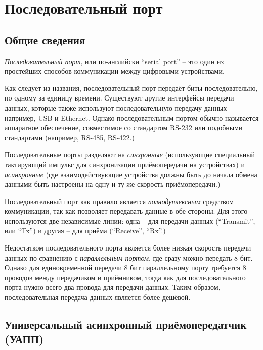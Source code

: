 \documentclass[../sparc.tex]{subfiles}
\begin{document}
\section{Последовательный порт}
\label{section:communication-serial-port}

\subsection{Общие сведения}

\emph{Последовательный порт}, или по-английски ``serial port'' -- это один из
простейших способов коммуникации между цифровыми устройствами.

Как следует из названия, последовательный порт передаёт биты последовательно, по
одному за единицу времени.  Существуют другие интерфейсы передачи данных,
которые также используют последовательную передачу данных -- например, USB и
Ethernet.  Однако последовательным портом обычно называется аппаратное
обеспечение, совместимое со стандартом RS-232 или подобными стандартами
(например, RS-485, RS-422.)

Последовательные порты разделяют на \emph{синхронные} (использующие специальный
тактирующий импульс для синхронизации приёмопередачи на устройствах) и
\emph{асинхронные} (где взаимодействующие устройства должны быть до начала
обмена данными быть настроены на одну и ту же скорость приёмопередачи.)

Последовательный порт как правило является \emph{полнодуплексным} средством
коммуникации, так как позволяет передавать данные в обе стороны.  Для этого
используются две независимые линии: одна -- для передачи данных (``Transmit'',
или ``Tx'') и другая -- для приёма (``Receive'', ``Rx''.)

Недостатком последовательного порта является более низкая скорость передачи
данных по сравнению с \emph{параллельным портом}, где сразу можно передать 8
бит.  Однако для единовременной передачи 8 бит параллельному порту требуется 8
проводов между передачиком и приёмником, тогда как для последовательного порта
нужно всего два провода для передачи данных.  Таким образом, последовательная
передача данных является более дешёвой.

\subsection{Универсальный асинхронный приёмопередатчик (УАПП)}
\end{document}
